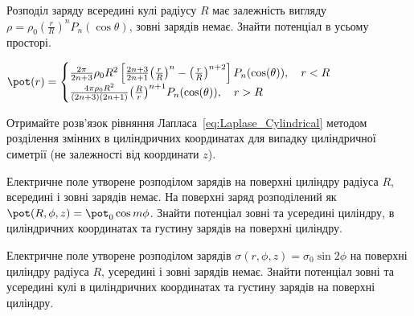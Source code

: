 \begin{problem}
Розподіл заряду всередині кулі радіусу $R$ має залежність вигляду  $\rho = \rho_0\left( \frac{r}{R}\right)^nP_n(\cos\theta) $, зовні зарядів немає. Знайти потенціал в усьому просторі.
\begin{solution}
	$\pot (r) =
		\begin{cases}
			\frac{{2\pi }}{{2n + 3}}{\rho _0}{R^2}\left[ {\frac{{2n + 3}}{{2n + 1}}{{\left( {\frac{r}{R}} \right)}^n} - {{\left( {\frac{r}{R}} \right)}^{n + 2}}} \right]{P_n}(\cos (\theta )) , \quad r<R \\
			\frac{{4\pi {\rho _0}{R^2}}}{{(2n + 3)(2n + 1)}}{\left( {\frac{R}{r}} \right)^{n + 1}}{P_n}(\cos (\theta )) , \quad r>R
		\end{cases}$
\end{solution}
\end{problem}


\begin{problem}%
Отримайте розв'язок рівняння Лапласа~\eqref{eq:Laplase_Cylindrical} методом розділення змінних в циліндричних координатах для випадку циліндричної симетрії (не залежності від координати $z$).
\end{problem}

\begin{problem}
Електричне поле утворене розподілом зарядів на поверхні циліндру радіуса $R$, всередині і зовні зарядів немає. На поверхні заряд розподілений як $\pot(R, \phi, z) = \pot_0\cos m\phi$. Знайти потенціал зовні та усередині циліндру, в циліндричних координатах та густину зарядів на поверхні циліндру.
\end{problem}


\begin{problem}
Електричне поле утворене розподілом зарядів $\sigma(r, \phi, z) = \sigma_0\sin2\phi$  на поверхні циліндру радіуса $R$, усередині і зовні зарядів немає. Знайти потенціал зовні та усередині кулі в циліндричних координатах та густину зарядів на поверхні циліндру.
\end{problem}


